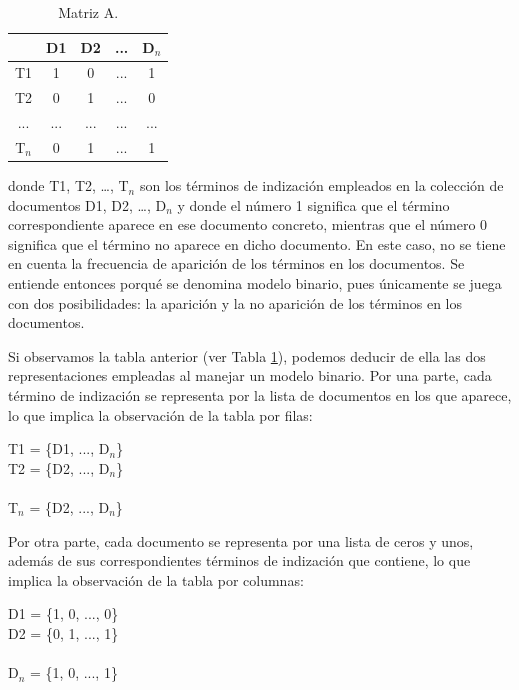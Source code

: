 \documentclass[titlepage]{article}
\begin{document}
\begin{table}[h]
	\begin{center}
		\begin{tabular}{ |c|c|c|c|c| }
			\hline 
			& D1 & D2 & ... & D$_{n}$ \\ 
			\hline
			T1 & 1 & 0 & ... & 1 \\ 
			\hline
			T2 & 0 & 1 & ... & 0 \\ 
			\hline
			... & ... & ...	& ... & ... \\
			\hline
			T$_{n}$ & 0 & 1 & ... & 1 \\ 
			\hline
		\end{tabular}
		\caption{Matriz A.}
		\label{fig: Table 2}
	\end{center}
\end{table}

donde T1, T2, …, T$_{n}$ son los términos de indización empleados en la colección de documentos D1, D2, …, D$_{n}$ y donde el número 1 significa que el término correspondiente aparece en ese documento concreto, mientras que el número 0 significa que el término no aparece en dicho documento. En este caso, no se tiene en cuenta la frecuencia de aparición de los términos en los documentos. Se entiende entonces porqué se denomina modelo binario, pues únicamente se juega con dos posibilidades: la aparición y la no aparición de los términos en los documentos.

Si observamos la tabla anterior (ver Tabla \ref{fig: Table 2}), podemos deducir de ella las dos representaciones empleadas al manejar un modelo binario. Por una parte, cada término de indización se representa por la lista de documentos en los que aparece, lo que implica la observación de la tabla por filas:

\begin{center}
	T1 = \{D1, ..., D$_{n}$\} \\
	T2 = \{D2, ..., D$_{n}$\} \\
	 \\
	T$_{n}$ = \{D2, ..., D$_{n}$\} \\
\end{center}

\newpage

Por otra parte, cada documento se representa por una lista de ceros y unos, además de sus correspondientes términos de indización que contiene, lo que implica la observación de la tabla por columnas:

\begin{center}
	D1 = \{1, 0, ..., 0\} \\
	D2 = \{0, 1, ..., 1\} \\
	 \\
	D$_{n}$ = \{1, 0, ..., 1\} \\
\end{center}
\end{document}
